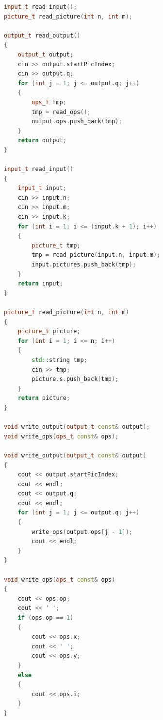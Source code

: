 \documentclass[times,specification,annotation]{style/itmo-student-thesis/itmo-student-thesis}
\begin{document}
\begin{lstlisting}[caption={Часть сгенерированного кода грейдера на языке C++},label={gen-grader-cpp},language=C++]
input_t read_input();
picture_t read_picture(int n, int m);

output_t read_output()
{
    output_t output;
    cin >> output.startPicIndex;
    cin >> output.q;
    for (int j = 1; j <= output.q; j++)
    {
        ops_t tmp;
        tmp = read_ops();
        output.ops.push_back(tmp);
    }
    return output;
}

input_t read_input()
{
    input_t input;
    cin >> input.n;
    cin >> input.m;
    cin >> input.k;
    for (int i = 1; i <= (input.k + 1); i++)
    {
        picture_t tmp;
        tmp = read_picture(input.n, input.m);
        input.pictures.push_back(tmp);
    }
    return input;
}

picture_t read_picture(int n, int m)
{
    picture_t picture;
    for (int i = 1; i <= n; i++)
    {
        std::string tmp;
        cin >> tmp;
        picture.s.push_back(tmp);
    }
    return picture;
}

void write_output(output_t const& output);
void write_ops(ops_t const& ops);

void write_output(output_t const& output)
{
    cout << output.startPicIndex;
    cout << endl;
    cout << output.q;
    cout << endl;
    for (int j = 1; j <= output.q; j++)
    {
        write_ops(output.ops[j - 1]);
        cout << endl;
    }
}

void write_ops(ops_t const& ops)
{
    cout << ops.op;
    cout << ' ';
    if (ops.op == 1)
    {
        cout << ops.x;
        cout << ' ';
        cout << ops.y;
    }
    else
    {
        cout << ops.i;
    }
}
\end{lstlisting}
\end{document}

